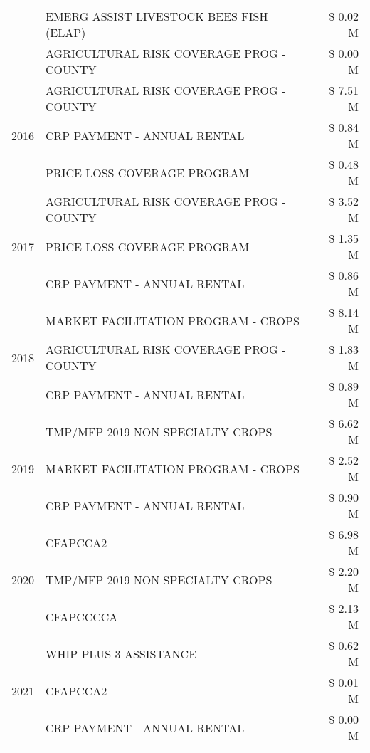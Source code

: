 \begin{tabular}{llr}
 & EMERG ASSIST LIVESTOCK BEES FISH (ELAP) & \$ 0.02 M \\
 & AGRICULTURAL RISK COVERAGE PROG - COUNTY & \$ 0.00 M \\
\cline{1-3}
\multirow[t]{3}{*}{2016} & AGRICULTURAL RISK COVERAGE PROG - COUNTY & \$ 7.51 M \\
 & CRP PAYMENT - ANNUAL RENTAL & \$ 0.84 M \\
 & PRICE LOSS COVERAGE PROGRAM & \$ 0.48 M \\
\cline{1-3}
\multirow[t]{3}{*}{2017} & AGRICULTURAL RISK COVERAGE PROG - COUNTY & \$ 3.52 M \\
 & PRICE LOSS COVERAGE PROGRAM & \$ 1.35 M \\
 & CRP PAYMENT - ANNUAL RENTAL & \$ 0.86 M \\
\cline{1-3}
\multirow[t]{3}{*}{2018} & MARKET FACILITATION PROGRAM - CROPS & \$ 8.14 M \\
 & AGRICULTURAL RISK COVERAGE PROG - COUNTY & \$ 1.83 M \\
 & CRP PAYMENT - ANNUAL RENTAL & \$ 0.89 M \\
\cline{1-3}
\multirow[t]{3}{*}{2019} & TMP/MFP 2019 NON SPECIALTY CROPS & \$ 6.62 M \\
 & MARKET FACILITATION PROGRAM - CROPS & \$ 2.52 M \\
 & CRP PAYMENT - ANNUAL RENTAL & \$ 0.90 M \\
\cline{1-3}
\multirow[t]{3}{*}{2020} & CFAPCCA2 & \$ 6.98 M \\
 & TMP/MFP 2019 NON SPECIALTY CROPS & \$ 2.20 M \\
 & CFAPCCCCA & \$ 2.13 M \\
\cline{1-3}
\multirow[t]{3}{*}{2021} & WHIP PLUS 3 ASSISTANCE & \$ 0.62 M \\
 & CFAPCCA2 & \$ 0.01 M \\
 & CRP PAYMENT - ANNUAL RENTAL & \$ 0.00 M \\
\cline{1-3}
\bottomrule
\end{tabular}
